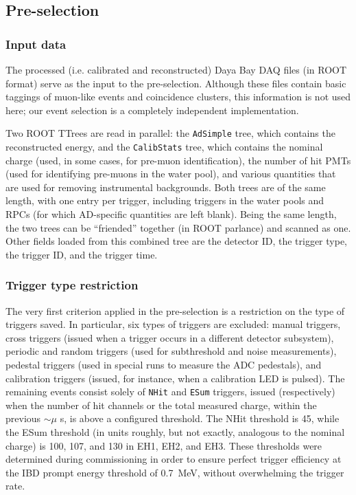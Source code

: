 \documentclass[../thesis.tex]{subfiles}
\begin{document}
\subsection{Pre-selection}
\label{sec:selPreSel}

\subsubsection{Input data}
\label{sec:selInputData}

The processed (i.e. calibrated and reconstructed) Daya Bay DAQ files (in ROOT format) serve as the input to the pre-selection. Although these files contain basic taggings of muon-like events and coincidence clusters, this information is not used here; our event selection is a completely independent implementation.

Two ROOT TTrees are read in parallel: the \texttt{AdSimple} tree, which contains the reconstructed energy, and the \texttt{CalibStats} tree, which contains the nominal charge (used, in some cases, for pre-muon identification), the number of hit PMTs (used for identifying pre-muons in the water pool), and various quantities that are used for removing instrumental backgrounds. Both trees are of the same length, with one entry per trigger, including triggers in the water pools and RPCs (for which AD-specific quantities are left blank). Being the same length, the two trees can be ``friended'' together (in ROOT parlance) and scanned as one. Other fields loaded from this combined tree are the detector ID, the trigger type, the trigger ID, and the trigger time.

\subsubsection{Trigger type restriction}
\label{sec:selTrigType}

The very first criterion applied in the pre-selection is a restriction on the type of triggers saved. In particular, six types of triggers are excluded: manual triggers, cross triggers (issued when a trigger occurs in a different detector subsystem), periodic and random triggers (used for subthreshold and noise measurements), pedestal triggers (used in special runs to measure the ADC pedestals), and calibration triggers (issued, for instance, when a calibration LED is pulsed). The remaining events consist solely of \texttt{NHit} and \texttt{ESum} triggers, issued (respectively) when the number of hit channels or the total measured charge, within the previous $\sim\mu$ s, is above a configured threshold. The NHit threshold is 45, while the ESum threshold (in units roughly, but not exactly, analogous to the nominal charge) is 100, 107, and 130 in EH1, EH2, and EH3. These thresholds were determined during commissioning in order to ensure perfect trigger efficiency at the IBD prompt energy threshold of 0.7~MeV, without overwhelming the trigger rate.
\end{document}
